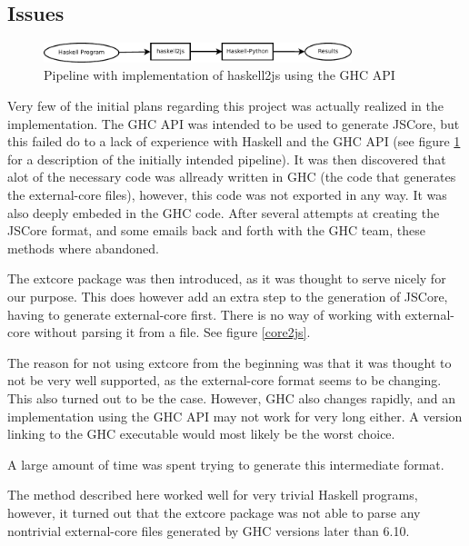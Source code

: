 \subsection{Issues}

\begin{figure}[H]
\centering
\includegraphics[width=0.8\textwidth]{diags/pipe_w_haskell2js}
\caption{Pipeline with implementation of haskell2js using the GHC API}
\label{haskell2js}
\end{figure}

Very few of the initial plans regarding this project was actually realized in the implementation.
The GHC API was intended to be used to generate JSCore, but this failed do to a lack of experience
with Haskell and the GHC API (see figure \ref{haskell2js} for a description of the initially intended
pipeline). It was then discovered that alot of the necessary code was allready
written in GHC (the code that generates the external-core files), however, this code was not 
exported in any way. It was also deeply embeded in the GHC code. After several attempts at creating
the JSCore format, and some emails back and forth with the GHC team, these methods where abandoned.

The extcore package was then introduced, as it was thought to serve nicely for our purpose. This
does however add an extra step to the generation of JSCore, having to generate external-core
first. There is no way of working with external-core without parsing it from a file. See figure \ref{core2js}.

The reason for not using extcore from the beginning was that it was thought to not be very 
well supported, as the external-core format seems to be changing. This also turned out to be
the case. However, GHC also changes rapidly, and an implementation using the GHC API may not
work for very long either. A version linking to the GHC executable would most likely be the
worst choice.

A large amount of time was spent trying to generate this intermediate format.

The method described here worked well for very trivial Haskell programs, however, it turned out that
the extcore package was not able to parse any nontrivial external-core files generated by GHC versions later 
than 6.10.


